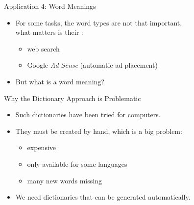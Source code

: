 \documentclass[professionalfonts, xcolor={usenames,svgnames,x11names,table}]{beamer}
\begin{document}
\begin{frame}{Application 4: Word Meanings}
    \begin{itemize}
        \item For some tasks, the word types are not that important,\\
            what matters is their :
            \begin{itemize}
                \item web search
                \item Google \emph{Ad Sense} (automatic ad placement)
            \end{itemize}
        \item But what is a word meaning?
    \end{itemize}

\end{frame}

\begin{frame}{Why the Dictionary Approach is Problematic}
    \begin{itemize}
        \item Such dictionaries have been tried for computers.\\
        \item They must be created by hand, which is a big problem:
            \begin{itemize}
                \item expensive
                \item only available for some languages
                \item many new words missing
            \end{itemize}
        \item We need dictionaries that can be generated automatically.
    \end{itemize}
\end{frame}
\end{document}
